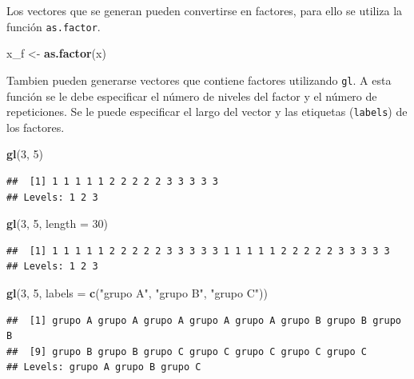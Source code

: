 \documentclass[]{book}
\newenvironment{Shaded}{\begin{snugshade}}{\end{snugshade}}
\newcommand{\KeywordTok}[1]{\textcolor[rgb]{0.13,0.29,0.53}{\textbf{#1}}}
\newcommand{\DataTypeTok}[1]{\textcolor[rgb]{0.13,0.29,0.53}{#1}}
\newcommand{\DecValTok}[1]{\textcolor[rgb]{0.00,0.00,0.81}{#1}}
\newcommand{\StringTok}[1]{\textcolor[rgb]{0.31,0.60,0.02}{#1}}
\newcommand{\NormalTok}[1]{#1}
\begin{document}
Los vectores que se generan pueden convertirse en factores, para ello se
utiliza la función \texttt{as.factor}.

\begin{Shaded}
\begin{Highlighting}[]
\NormalTok{x_f <-}\StringTok{ }\KeywordTok{as.factor}\NormalTok{(x)}
\end{Highlighting}
\end{Shaded}

Tambien pueden generarse vectores que contiene factores utilizando
\texttt{gl}. A esta función se le debe especificar el número de niveles
del factor y el número de repeticiones. Se le puede especificar el largo
del vector y las etiquetas (\texttt{labels}) de los factores.

\begin{Shaded}
\begin{Highlighting}[]
\KeywordTok{gl}\NormalTok{(}\DecValTok{3}\NormalTok{, }\DecValTok{5}\NormalTok{)}
\end{Highlighting}
\end{Shaded}

\begin{verbatim}
##  [1] 1 1 1 1 1 2 2 2 2 2 3 3 3 3 3
## Levels: 1 2 3
\end{verbatim}

\begin{Shaded}
\begin{Highlighting}[]
\KeywordTok{gl}\NormalTok{(}\DecValTok{3}\NormalTok{, }\DecValTok{5}\NormalTok{, }\DataTypeTok{length =} \DecValTok{30}\NormalTok{)}
\end{Highlighting}
\end{Shaded}

\begin{verbatim}
##  [1] 1 1 1 1 1 2 2 2 2 2 3 3 3 3 3 1 1 1 1 1 2 2 2 2 2 3 3 3 3 3
## Levels: 1 2 3
\end{verbatim}

\begin{Shaded}
\begin{Highlighting}[]
\KeywordTok{gl}\NormalTok{(}\DecValTok{3}\NormalTok{, }\DecValTok{5}\NormalTok{, }\DataTypeTok{labels =} \KeywordTok{c}\NormalTok{(}\StringTok{"grupo A"}\NormalTok{, }\StringTok{"grupo B"}\NormalTok{, }\StringTok{"grupo C"}\NormalTok{))}
\end{Highlighting}
\end{Shaded}

\begin{verbatim}
##  [1] grupo A grupo A grupo A grupo A grupo A grupo B grupo B grupo B
##  [9] grupo B grupo B grupo C grupo C grupo C grupo C grupo C
## Levels: grupo A grupo B grupo C
\end{verbatim}
\end{document}
